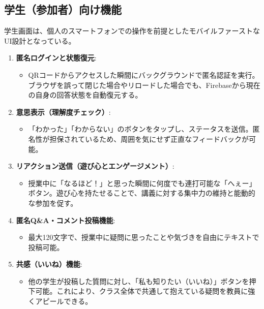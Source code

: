 \documentclass[11pt,a4paper]{jsarticle}
\begin{document}
\subsection{学生（参加者）向け機能}
学生画面は、個人のスマートフォンでの操作を前提としたモバイルファーストなUI設計となっている。

\begin{enumerate}
    \item \textbf{匿名ログインと状態復元}:
    \begin{itemize}
        \item QRコードからアクセスした瞬間にバックグラウンドで匿名認証を実行。ブラウザを誤って閉じた場合やリロードした場合でも、Firebaseから現在の自身の回答状態を自動復元する。
    \end{itemize}
    
    \item \textbf{意思表示（理解度チェック）}:
    \begin{itemize}
        \item 「わかった」「わからない」のボタンをタップし、ステータスを送信。匿名性が担保されているため、周囲を気にせず正直なフィードバックが可能。
    \end{itemize}
    
    \item \textbf{リアクション送信（遊び心とエンゲージメント）}:
    \begin{itemize}
        \item 授業中に「なるほど！」と思った瞬間に何度でも連打可能な「へぇー」ボタン。遊び心を持たせることで、講義に対する集中力の維持と能動的な参加を促す。
    \end{itemize}
    
    \item \textbf{匿名Q\&A・コメント投稿機能}:
    \begin{itemize}
        \item 最大120文字で、授業中に疑問に思ったことや気づきを自由にテキストで投稿可能。
    \end{itemize}
    
    \item \textbf{共感（いいね）機能}:
    \begin{itemize}
        \item 他の学生が投稿した質問に対し、「私も知りたい（いいね）」ボタンを押下可能。これにより、クラス全体で共通して抱えている疑問を教員に強くアピールできる。
    \end{itemize}
\end{enumerate}
\end{document}

